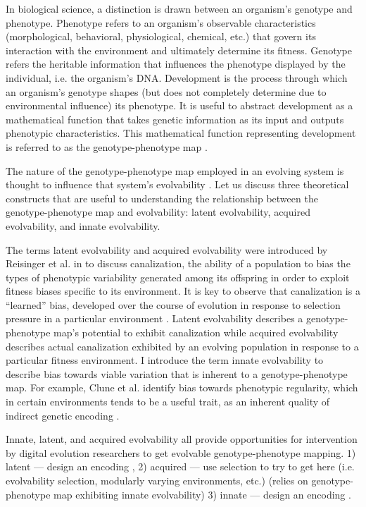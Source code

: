 In biological science, a distinction is drawn between an organism's genotype and phenotype.
Phenotype refers to an organism's observable characteristics (morphological, behavioral, physiological, chemical, etc.) that govern its interaction with the environment and ultimately determine its fitness.
Genotype refers the heritable information that influences the phenotype displayed by the individual, i.e. the organism's DNA.
Development is the process through which an organism's genotype shapes (but does not completely determine due to environmental influence) its phenotype.
It is useful to abstract development as a mathematical function that takes genetic information as its input and outputs phenotypic characteristics.
This mathematical function representing development is referred to as the genotype-phenotype map \cite{alberch1991genes}.

The nature of the genotype-phenotype map employed in an evolving system is thought to influence that system's evolvability \cite{pigliucci2010genotype}.
Let us discuss three theoretical constructs that are useful to understanding the relationship between the genotype-phenotype map and evolvability: latent evolvability, acquired evolvability, and innate evolvability.

The terms latent evolvability and acquired evolvability were introduced by Reisinger et al. in \cite{reisinger2005towards} to discuss canalization, the ability of a population to bias the types of phenotypic variability generated among its offspring in order to exploit fitness biases specific to its environment.
It is key to observe that canalization is a ``learned'' bias, developed over the course of evolution in response to selection pressure in a particular environment \cite{reisinger2005towards}.
Latent evolvability describes a genotype-phenotype map's potential to exhibit canalization while acquired evolvability describes actual canalization exhibited by an evolving population in response to a particular fitness environment.
I introduce the term innate evolvability to describe bias towards viable variation that is inherent to a genotype-phenotype map.
For example, Clune et al. identify bias towards phenotypic regularity, which in certain environments tends to be a useful trait, as an inherent quality of indirect genetic encoding \cite{clune2008generative}.

Innate, latent, and acquired evolvability all provide opportunities for intervention  by digital evolution researchers to get evolvable genotype-phenotype mapping.
1) latent --- design an encoding \cite{reisinger2005towards},
2) acquired --- use selection to try to get here (i.e. evolvability selection, modularly varying environments, etc.) \cite{mengistu2016evolvability, kashtan2005spontaneous} (relies on genotype-phenotype map exhibiting innate evolvability)
3) innate --- design an encoding \cite{clune2011performance}.


